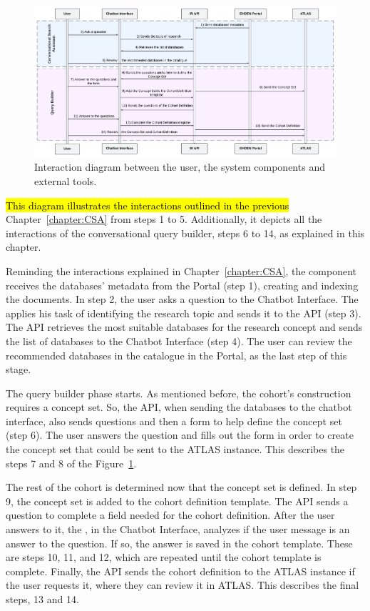 \begin{figure}[H]
  \includegraphics[width=\textwidth]{figs/chapter4/interaction_diagram.png}
  \centering
  \caption[Interaction diagram between components]{Interaction diagram between the user, the system components and external tools.}
  \label{fig_interaction}
\end{figure}

\hl{This diagram illustrates the interactions outlined in the previous} Chapter~\ref{chapter:CSA} from steps 1 to 5. Additionally, it depicts all the interactions of the conversational query builder, steps 6 to 14, as explained in this chapter.

Reminding the interactions explained in Chapter~\ref{chapter:CSA}, the {\ir} component receives the databases' metadata from the {\ehden} Portal (step 1), creating and indexing the documents. In step 2, the user asks a question to the Chatbot Interface. The {\llm} applies his task of identifying the research topic and sends it to the {\ir} API (step 3). The {\ir} API retrieves the most suitable databases for the research concept and sends the list of databases to the Chatbot Interface (step 4). The user can review the recommended databases in the catalogue in the {\ehden} Portal, as the last step of this stage.

The query builder phase starts. As mentioned before, the cohort's construction requires a concept set. So, the {\ir} API, when sending the databases to the chatbot interface, also sends questions and then a form to help define the concept set (step 6). The user answers the question and fills out the form in order to create the concept set that could be sent to the ATLAS instance. This describes the steps 7 and 8 of the Figure~\ref{fig_interaction}. 

The rest of the cohort is determined now that the concept set is defined. In step 9, the concept set is added to the cohort definition template. The {\ir} API sends a question to complete a field needed for the cohort definition. After the user answers to it, the {\llm}, in the Chatbot Interface, analyzes if the user message is an answer to the question. If so, the answer is saved in the cohort template. These are steps 10, 11, and 12, which are repeated until the cohort template is complete. Finally, the API sends the cohort definition to the ATLAS instance if the user requests it, where they can review it in ATLAS. This describes the final steps, 13 and 14. 


